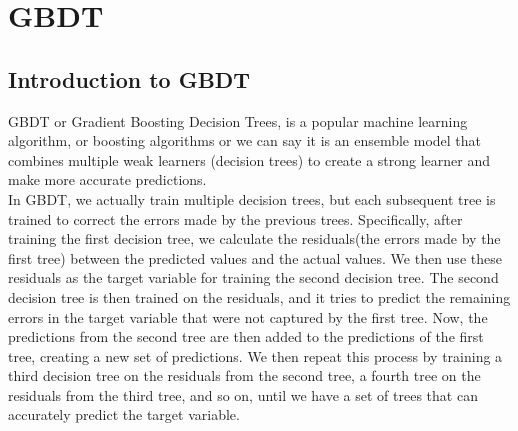 \documentclass[12pt]{article}
\begin{document}
\begin{verbatim}

\end{verbatim}


\section{GBDT}
\subsection{Introduction to GBDT}
GBDT or Gradient Boosting Decision Trees, is a popular machine learning algorithm, or boosting algorithms or we can say it is an ensemble model that combines multiple weak learners (decision trees) to create a strong learner and make more accurate predictions.\\

In GBDT, we actually train multiple decision trees, but each subsequent tree is trained to correct the errors made by the previous trees. Specifically, after training the first decision tree, we calculate the residuals(the errors made by the first tree) between the predicted values and the actual values. We then use these residuals as the target variable for training the second decision tree. The second decision tree is then trained on the residuals, and it tries to predict the remaining errors in the target variable that were not captured by the first tree. Now, the predictions from the second tree are then added to the predictions of the first tree, creating a new set of predictions. We then repeat this process by training a third decision tree on the residuals from the second tree, a fourth tree on the residuals from the third tree, and so on, until we have a set of trees that can accurately predict the target variable.\\
\end{document}
